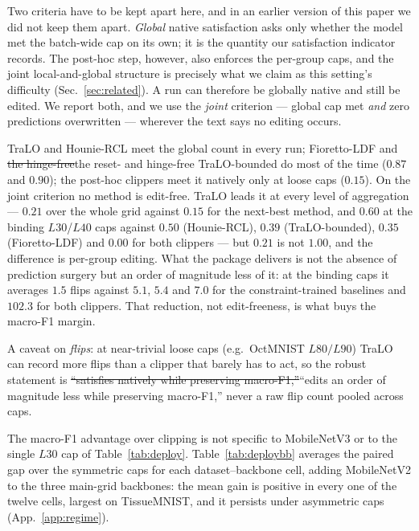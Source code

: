 \documentclass[10pt]{article}
\newcommand{\del}[1]{{\color{red}\sout{#1}}}
\begin{document}
{\color{blue}Two criteria have to be kept apart here, and in an earlier version of
this paper we did not keep them apart. \emph{Global} native satisfaction asks
only whether the model met the batch-wide cap on its own; it is the quantity our
satisfaction indicator records. The post-hoc step, however, also enforces the
per-group caps, and the joint local-and-global structure is precisely what we
claim as this setting's difficulty (Sec.~\ref{sec:related}). A run can therefore
be globally native and still be edited. We report both, and we use the
\emph{joint} criterion --- global cap met \emph{and} zero predictions
overwritten --- wherever the text says no editing occurs.}

TraLO and Hounie-RCL meet the {\color{blue}global} count in every run;
Fioretto-LDF and \del{the hinge-free}{\color{blue}the reset- and hinge-free}
TraLO-bounded do most of the time ($0.87$ and $0.90$); the
post-hoc clippers meet it natively only at loose caps
{\color{blue}($0.15$)}.
{\color{blue}On the joint criterion no method is edit-free. TraLO leads it at
every level of aggregation --- $0.21$ over the whole grid against $0.15$ for the
next-best method, and $0.60$ at the binding $L30$/$L40$ caps against $0.50$
(Hounie-RCL), $0.39$ (TraLO-bounded), $0.35$ (Fioretto-LDF) and $0.00$ for both
clippers --- but $0.21$ is not $1.00$, and the difference is per-group editing.
What the package delivers is not the absence of prediction surgery but an order
of magnitude less of it: at the binding caps it averages $1.5$ flips against
$5.1$, $5.4$ and $7.0$ for the constraint-trained baselines and $102.3$ for both
clippers. That reduction, not edit-freeness, is what buys the macro-F1 margin.}

A caveat on
\emph{flips}: at near-trivial loose caps (e.g.\ OctMNIST $L80/L90$)
TraLO can record more flips than a clipper that barely has to act, so
the robust statement is \del{``satisfies natively while preserving
macro-F1,''}{\color{blue}``edits an order of magnitude less while preserving
macro-F1,''} never a raw flip count
{\color{blue}pooled across caps}.

The macro-F1 advantage over clipping is not specific to MobileNetV3 or
to the single $L30$ cap of Table~\ref{tab:deploy}.
Table~\ref{tab:deploybb} averages the paired gap over the symmetric caps
for each dataset--backbone cell, adding MobileNetV2 to the three
main-grid backbones: the mean gain is positive in every one of the
twelve cells, largest on TissueMNIST, and it persists under asymmetric
caps (App.~\ref{app:regime}).
\end{document}
